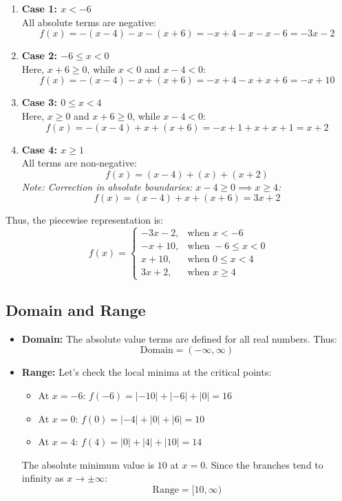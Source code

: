 \documentclass[11pt, a4paper]{article}
\begin{document}
\begin{enumerate}
    \item \textbf{Case 1: $x < -6$} \\
    All absolute terms are negative:
    \[ f(x) = -(x - 4) - x - (x + 6) = -x + 4 - x - x - 6 = -3x - 2 \]

    \item \textbf{Case 2: $-6 \le x < 0$} \\
    Here, $x + 6 \ge 0$, while $x < 0$ and $x - 4 < 0$:
    \[ f(x) = -(x - 4) - x + (x + 6) = -x + 4 - x + x + 6 = -x + 10 \]

    \item \textbf{Case 3: $0 \le x < 4$} \\
    Here, $x \ge 0$ and $x + 6 \ge 0$, while $x - 4 < 0$:
    \[ f(x) = -(x - 4) + x + (x + 6) = -x + 1 + x + x + 1 = x + 2 \]

    \item \textbf{Case 4: $x \ge 1$} \\
    All terms are non-negative:
    \[ f(x) = (x - 4) + (x) + (x + 2) \]
    \textit{Note: Correction in absolute boundaries: $x - 4 \ge 0 \implies x \ge 4$:}
    \[ f(x) = (x - 4) + x + (x + 6) = 3x + 2 \]
\end{enumerate}

Thus, the piecewise representation is:
\[ 
f(x) = \begin{cases} 
-3x - 2, & \text{when } x < -6 \\ 
-x + 10, & \text{when } -6 \le x < 0 \\ 
x + 10, & \text{when } 0 \le x < 4 \\ 
3x + 2, & \text{when } x \ge 4 
\end{cases} 
\]

\subsection*{Domain and Range}
\begin{itemize}
    \item \textbf{Domain:} The absolute value terms are defined for all real numbers. Thus:
    \[ \text{Domain} = (-\infty, \infty) \]
    \item \textbf{Range:} Let's check the local minima at the critical points:
    \begin{itemize}
        \item At $x = -6$: $f(-6) = |-10| + |-6| + |0| = 16$
        \item At $x = 0$: $f(0) = |-4| + |0| + |6| = 10$
        \item At $x = 4$: $f(4) = |0| + |4| + |10| = 14$
    \end{itemize}
    The absolute minimum value is $10$ at $x = 0$. Since the branches tend to infinity as $x \to \pm \infty$:
    \[ \text{Range} = [10, \infty) \]
\end{itemize}
\end{document}
